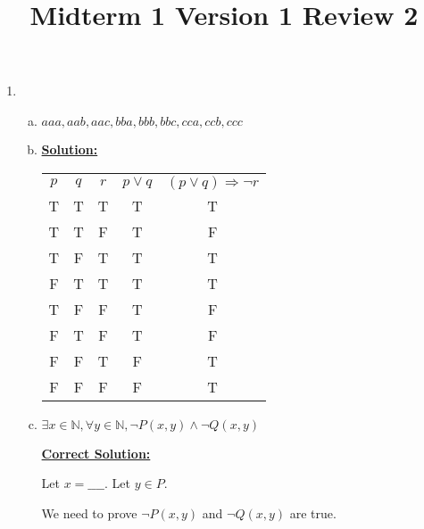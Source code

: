 \documentclass[12pt]{article}
\begin{document}
\title{Midterm 1 Version 1 Review 2}
\maketitle

\begin{enumerate}[1.]
    \item

    \begin{enumerate}[a)]
        \item ${aaa,aab,aac,bba,bbb,bbc,cca,ccb,ccc}$
        \item

        \underline{\textbf{Solution:}}

        \begin{tabular}{|c|c|c|c|c|}
            \hline
            $p$ & $q$ & $r$ & $p \lor q$ & $(p \lor q) \Rightarrow \neg r$\\
            T & T & T & T & T \\
            \hline
            T & T & F & T & F \\
            \hline
            T & F & T & T & T \\
            \hline
            F & T & T & T & T \\
            \hline
            T & F & F & T & F \\
            \hline
            F & T & F & T & F \\
            \hline
            F & F & T & F & T \\
            \hline
            F & F & F & F & T \\
            \hline
        \end{tabular}

        \item

        $\exists x \in \mathbb{N}, \forall y \in \mathbb{N}, \neg P(x,y) \land \neg Q(x,y)$

        \bigskip

        \begin{mdframed}
            \underline{\textbf{Correct Solution:}}

            \bigskip

            Let $x = \_\_\_\_$. Let $y \in P$.

            \bigskip

            \color{red}We need to prove $\neg P(x,y)$ and $\neg Q(x,y)$ are true.\color{black}

        \end{mdframed}


\end{enumerate}
\end{enumerate}
\end{document}
